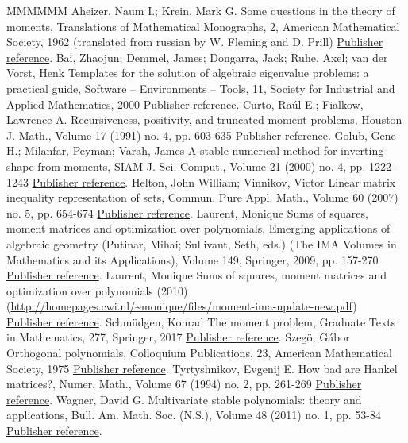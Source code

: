 \documentclass[11pt]{article}
\theoremstyle{definition}
\numberwithin{equation}{section}
\numberwithin{figure}{section}
\numberwithin{table}{section}
\begin{document}
\begin{thebibliography}{MMMMMM}
 Aheizer, Naum I.; Krein, Mark G. Some questions in the theory of moments, Translations of Mathematical Monographs, 2, American Mathematical Society, 1962 (translated from russian by W. Fleming and D. Prill) \href{https://ahl.centre-mersenne.org/item/AHL_2020__3__1327_0/#anheizer}{Publisher reference}.
 Bai, Zhaojun; Demmel, James; Dongarra, Jack; Ruhe, Axel; van der Vorst, Henk Templates for the solution of algebraic eigenvalue problems: a practical guide, Software – Environments – Tools, 11, Society for Industrial and Applied Mathematics, 2000 \href{https://ahl.centre-mersenne.org/item/AHL_2020__3__1327_0/#eig}{Publisher reference}.
 Curto, Raúl E.; Fialkow, Lawrence A. Recursiveness, positivity, and truncated moment problems, Houston J. Math., Volume 17 (1991) no. 4, pp. 603-635 \href{https://ahl.centre-mersenne.org/item/AHL_2020__3__1327_0/#curto}{Publisher reference}.
 Golub, Gene H.; Milanfar, Peyman; Varah, James A stable numerical method for inverting shape from moments, SIAM J. Sci. Comput., Volume 21 (2000) no. 4, pp. 1222-1243 \href{https://ahl.centre-mersenne.org/item/AHL_2020__3__1327_0/#golub}{Publisher reference}.
 Helton, John William; Vinnikov, Victor Linear matrix inequality representation of sets, Commun. Pure Appl. Math., Volume 60 (2007) no. 5, pp. 654-674 \href{https://ahl.centre-mersenne.org/item/AHL_2020__3__1327_0/#hv}{Publisher reference}.
 Laurent, Monique Sums of squares, moment matrices and optimization over polynomials, Emerging applications of algebraic geometry (Putinar, Mihai; Sullivant, Seth, eds.) (The IMA Volumes in Mathematics and its Applications), Volume 149, Springer, 2009, pp. 157-270 \href{https://ahl.centre-mersenne.org/item/AHL_2020__3__1327_0/#la1}{Publisher reference}.
 Laurent, Monique Sums of squares, moment matrices and optimization over polynomials (2010) (\url{http://homepages.cwi.nl/~monique/files/moment-ima-update-new.pdf}) \href{https://ahl.centre-mersenne.org/item/AHL_2020__3__1327_0/#la2}{Publisher reference}.
 Schmüdgen, Konrad The moment problem, Graduate Texts in Mathematics, 277, Springer, 2017 \href{https://ahl.centre-mersenne.org/item/AHL_2020__3__1327_0/#sch}{Publisher reference}.
 Szegö, Gábor Orthogonal polynomials, Colloquium Publications, 23, American Mathematical Society, 1975 \href{https://ahl.centre-mersenne.org/item/AHL_2020__3__1327_0/#sze}{Publisher reference}.
 Tyrtyshnikov, Evgenij E. How bad are Hankel matrices?, Numer. Math., Volume 67 (1994) no. 2, pp. 261-269 \href{https://ahl.centre-mersenne.org/item/AHL_2020__3__1327_0/#illhankel}{Publisher reference}.
 Wagner, David G. Multivariate stable polynomials: theory and applications, Bull. Am. Math. Soc. (N.S.), Volume 48 (2011) no. 1, pp. 53-84 \href{https://ahl.centre-mersenne.org/item/AHL_2020__3__1327_0/#wag}{Publisher reference}.
\end{thebibliography}
\end{document}
